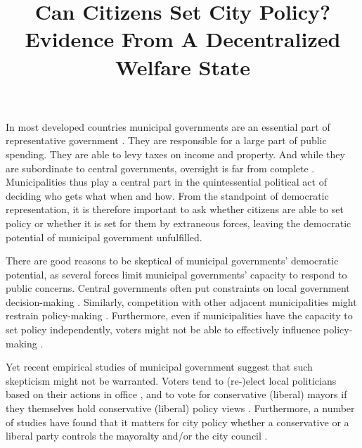 \documentclass[a4paper,12pt]{article}
\title{\bigskip \bigskip \sffamily \LARGE{Can Citizens Set City Policy?} \\ \Large{ Evidence From A Decentralized Welfare State}}
\begin{document}
\noindent In most developed countries municipal governments are an essential part of representative government \citep{trounstine2009all,kersting2013reforming}. They are responsible for a large part of public spending.  They are able to levy taxes on income and property. And while they are subordinate to central governments, oversight is far from complete \citep{oecd2016subnational}. Municipalities thus play a central part in the quintessential political act of deciding who gets what when and how. From the standpoint of democratic representation, it is therefore important to ask whether citizens are able to set policy or whether it is set for them by extraneous forces, leaving the democratic potential of municipal government unfulfilled.


There are good reasons to be skeptical of municipal governments' democratic potential, as several forces limit municipal governments' capacity to respond to public concerns. Central governments often put constraints on local government decision-making \citep{peterson1981city}. Similarly, competition with other adjacent municipalities might restrain policy-making \citep{salmon2006horizontal,tiebout1956pure}. Furthermore, even if municipalities have the capacity to set policy independently, voters might not be able to effectively influence policy-making \citep[e.g.,][]{gerber2011mayors}. 


Yet recent empirical studies of municipal government suggest that such skepticism might not be warranted. Voters tend to (re-)elect local politicians based on their actions in office \citep[e.g.,][]{boyne2009democracy}, and to vote for conservative (liberal)  mayors if they themselves hold conservative (liberal) policy views  \citep{sances2017ideology,boudreau2015lost,hopkins2017retrospective}. Furthermore, a number of studies have found that it matters for city policy whether a conservative or a liberal party controls the mayoralty and/or the city council \citep[e.g.,][]{fiva2016power,blom2006parties,de2016mayoral}. 
\end{document}

